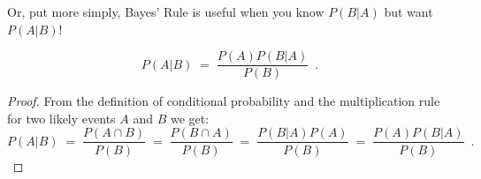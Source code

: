 Or, put more simply, Bayes' Rule is useful when you know $P(B | A)$ but
want $P(A | B )$!

\begin{framed}
\begin{prop}\label{P:BayesRule}
\begin{equation}
P(A|B)\;=\;\frac{P(A)P(B|A)}{P(B)} \enspace .
\end{equation}
\end{prop}
\end{framed}
\begin{proof}
From the  definition of conditional probability and the multiplication rule for two likely events $A$ and $B$ we get:
$$
P(A|B)\;=\;\frac{P(A \cap B)}{P(B)} \; = \;\frac{P(B \cap A)}{P(B)}\;= \; \frac{P(B|A)P(A)}{P(B)}\;  =\; \frac{P(A)P(B|A)}{P(B)} \enspace .
$$
\end{proof}

